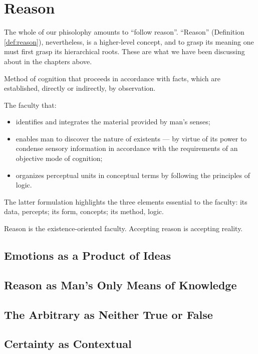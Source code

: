 \chapter{Reason}

    The whole of our phisolophy amounts to ``follow reason''. ``Reason'' (Definition \ref{def:reason}), nevertheless, is a higher-level concept, and to grasp its meaning one must first grasp its hierarchical roots. These are what we have been discussing about in the chapters above.

        \begin{definition}[Reason]
        \label{def:reason}
            Method of cognition that proceeds in accordance with facts, which are established, directly or indirectly, by observation.
            
            The faculty that:
            \begin{itemize}
                \item identifies and integrates the material provided by man's senses;
                \item enables man to discover the nature of existents — by virtue of its power to condense sensory information in accordance with the requirements of an objective mode of cognition;
                \item organizes perceptual units in conceptual terms by following the principles of logic.
            \end{itemize}
        \end{definition}

        \begin{remark}
            The latter formulation highlights the three elements essential to the faculty: its data, percepts; its form, concepts; its method, logic.
        \end{remark}

    Reason is the existence-oriented faculty. Accepting reason is accepting reality.

    \section{Emotions as a Product of Ideas}

    \section{Reason as Man's Only Means of Knowledge}

    \section{The Arbitrary as Neither True or False}

    \section{Certainty as Contextual}